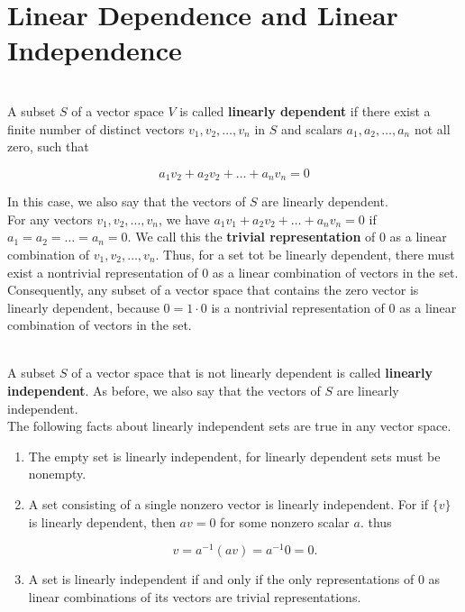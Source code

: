 \section{Linear Dependence and Linear Independence}

\begin{definition}
	\hfill\\
	A subset $S$ of a vector space $V$ is called \textbf{linearly dependent} if there exist a finite number of distinct vectors $v_1, v_2, \dots, v_n$ in $S$ and scalars $a_1, a_2, \dots, a_n$ not all zero, such that

	\[a_1v_2 + a_2v_2 + \dots + a_nv_n = 0\]

	In this case, we also say that the vectors of $S$ are linearly dependent.\\

	For any vectors $v_1, v_2, \dots, v_n$, we have $a_1v_1 + a_2v_2 + \dots + a_nv_n = 0$ if $a_1 = a_2 = \dots = a_n = 0$. We call this the \textbf{trivial representation} of $0$ as a linear combination of $v_1, v_2, \dots, v_n$. Thus, for a set tot be linearly dependent, there must exist a nontrivial representation of $0$ as a linear combination of vectors in the set. Consequently, any subset of a vector space that contains the zero vector is linearly dependent, because $0 = 1 \cdot 0$ is a nontrivial representation of $0$ as a linear combination of vectors in the set.
\end{definition}

\begin{definition}
	\hfill\\
	A subset $S$ of a vector space that is not linearly dependent is called \textbf{linearly independent}. As before, we also say that the vectors of $S$ are linearly independent.\\

	The following facts about linearly independent sets are true in any vector space.

	\begin{enumerate}
		\item The empty set is linearly independent, for linearly dependent sets must be nonempty.
		\item A set consisting of a single nonzero vector is linearly independent. For if $\{v\}$ is linearly dependent, then $av = 0$ for some nonzero scalar $a$. thus

		      \[v = a^{-1}(av) = a^{-1}0 = 0.\]

		\item A set is linearly independent if and only if the only representations of $0$ as linear combinations of its vectors are trivial representations.
	\end{enumerate}
\end{definition}

